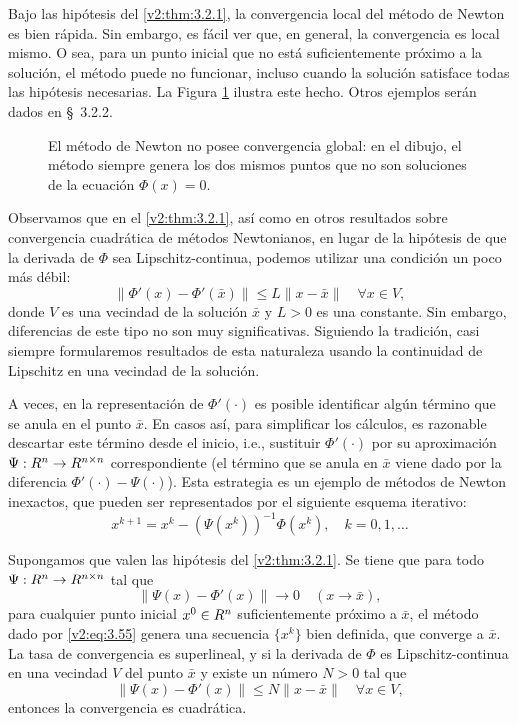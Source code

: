 Bajo las hipótesis del \cref{v2:thm:3.2.1}, la convergencia local del método de Newton es bien rápida. Sin embargo, es fácil ver que, en general, la convergencia es local mismo. O sea, para un punto inicial que no está suficientemente próximo a la solución, el método puede no funcionar, incluso cuando la solución satisface todas las hipótesis necesarias. La Figura \ref{v2:fig:3.2.2} ilustra este hecho. Otros ejemplos serán dados en \S~3.2.2.

\begin{figure}[htpb]
    \centering
    \caption{El método de Newton no posee convergencia global: en el dibujo, el método siempre genera los dos mismos puntos que no son soluciones de la ecuación $\Phi(x) = 0$.}
    \label{v2:fig:3.2.2}
\end{figure}

Observamos que en el \cref{v2:thm:3.2.1}, así como en otros resultados sobre convergencia cuadrática de métodos Newtonianos, en lugar de la hipótesis de que la derivada de $\Phi$ sea Lipschitz-continua, podemos utilizar una condición un poco más débil:
\[
    \|\Phi'(x) - \Phi'(\bar{x})\| \le L \|x - \bar{x}\| \quad \forall x \in V,
\]
donde $V$ es una vecindad de la solución $\bar{x}$ y $L > 0$ es una constante. Sin embargo, diferencias de este tipo no son muy significativas. Siguiendo la tradición, casi siempre formularemos resultados de esta naturaleza usando la continuidad de Lipschitz en una vecindad de la solución.

A veces, en la representación de $\Phi'(\cdot)$ es posible identificar algún término que se anula en el punto $\bar{x}$. En casos así, para simplificar los cálculos, es razonable descartar este término desde el inicio, i.e., sustituir $\Phi'(\cdot)$ por su aproximación $\Psi : R^n \to R^{n \times n}$ correspondiente (el término que se anula en $\bar{x}$ viene dado por la diferencia $\Phi'(\cdot) - \Psi(\cdot)$). Esta estrategia es un ejemplo de métodos de Newton inexactos, que pueden ser representados por el siguiente esquema iterativo:
\begin{equation}
    x^{k+1} = x^k - (\Psi(x^k))^{-1}\Phi(x^k), \quad k = 0, 1, \dots
    \label{v2:eq:3.55}
\end{equation}

\begin{corollary}\label{v2:cor:3.2.1}
    Supongamos que valen las hipótesis del \cref{v2:thm:3.2.1}. Se tiene que para todo $\Psi : R^n \to R^{n \times n}$ tal que
    \[
        \|\Psi(x) - \Phi'(x)\| \to 0 \quad (x \to \bar{x}),
    \]
    para cualquier punto inicial $x^0 \in R^n$ suficientemente próximo a $\bar{x}$, el método dado por \eqref{v2:eq:3.55} genera una secuencia $\{x^k\}$ bien definida, que converge a $\bar{x}$. La tasa de convergencia es superlineal, y si la derivada de $\Phi$ es Lipschitz-continua en una vecindad $V$ del punto $\bar{x}$ y existe un número $N > 0$ tal que
    \[
        \|\Psi(x) - \Phi'(x)\| \le N \|x - \bar{x}\| \quad \forall x \in V,
    \]
    entonces la convergencia es cuadrática.
\end{corollary}

